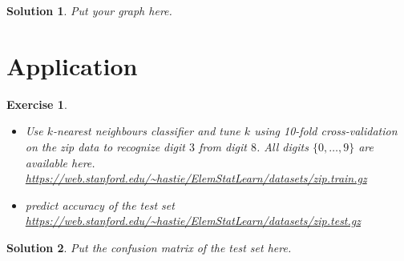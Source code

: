 \documentclass[12pt,a4paper]{article}
\newtheorem{exercise}{Exercise}
\numberwithin{exercise}{section} %
\newtheorem{solution}{Solution}
\numberwithin{solution}{section} %
\begin{document}
\begin{solution}
Put your graph here.
\end{solution}
\newpage 

\section{Application}
\begin{exercise}
\begin{itemize}
\item Use $k$-nearest neighbours classifier and tune $k$ using 10-fold cross-validation  on the zip data to recognize digit $3$ from digit $8$. All digits $\{0,\ldots, 9 \}$ are available here.\\
\url{https://web.stanford.edu/~hastie/ElemStatLearn/datasets/zip.train.gz}
\item predict accuracy of the test set \\
\url{https://web.stanford.edu/~hastie/ElemStatLearn/datasets/zip.test.gz}
\end{itemize}
\end{exercise}
\begin{solution}
Put the \emph{confusion matrix} of the test set here.
\end{solution}
\end{document}
